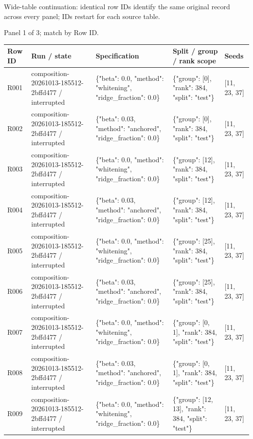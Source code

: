 \documentclass[10pt]{article}
\begin{document}
Wide-table continuation: identical row IDs identify the same original record across every panel; IDs restart for each source table.
\par\noindent Panel 1 of 3; match by Row ID.
{\scriptsize\setlength{\tabcolsep}{2pt}
\begin{longtable}{p{}p{}p{}p{}p{}}
Row ID & Run / state & Specification & Split / group / rank scope & Seeds \\
\hline\endhead
R001 & composition-20261013-185512-2bffd477 / interrupted & \{"beta": 0.0, "method": "whitening", "ridge\_fraction": 0.0\} & \{"group": [0], "rank": 384, "split": "test"\} & [11, 23, 37] \\
R002 & composition-20261013-185512-2bffd477 / interrupted & \{"beta": 0.03, "method": "anchored", "ridge\_fraction": 0.0\} & \{"group": [0], "rank": 384, "split": "test"\} & [11, 23, 37] \\
R003 & composition-20261013-185512-2bffd477 / interrupted & \{"beta": 0.0, "method": "whitening", "ridge\_fraction": 0.0\} & \{"group": [12], "rank": 384, "split": "test"\} & [11, 23, 37] \\
R004 & composition-20261013-185512-2bffd477 / interrupted & \{"beta": 0.03, "method": "anchored", "ridge\_fraction": 0.0\} & \{"group": [12], "rank": 384, "split": "test"\} & [11, 23, 37] \\
R005 & composition-20261013-185512-2bffd477 / interrupted & \{"beta": 0.0, "method": "whitening", "ridge\_fraction": 0.0\} & \{"group": [25], "rank": 384, "split": "test"\} & [11, 23, 37] \\
R006 & composition-20261013-185512-2bffd477 / interrupted & \{"beta": 0.03, "method": "anchored", "ridge\_fraction": 0.0\} & \{"group": [25], "rank": 384, "split": "test"\} & [11, 23, 37] \\
R007 & composition-20261013-185512-2bffd477 / interrupted & \{"beta": 0.0, "method": "whitening", "ridge\_fraction": 0.0\} & \{"group": [0, 1], "rank": 384, "split": "test"\} & [11, 23, 37] \\
R008 & composition-20261013-185512-2bffd477 / interrupted & \{"beta": 0.03, "method": "anchored", "ridge\_fraction": 0.0\} & \{"group": [0, 1], "rank": 384, "split": "test"\} & [11, 23, 37] \\
R009 & composition-20261013-185512-2bffd477 / interrupted & \{"beta": 0.0, "method": "whitening", "ridge\_fraction": 0.0\} & \{"group": [12, 13], "rank": 384, "split": "test"\} & [11, 23, 37] \\

\end{longtable}}
\end{document}
